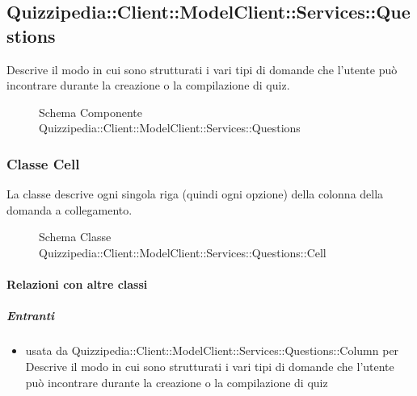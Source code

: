 \subsection{Quizzipedia::Client::ModelClient::Services::Questions}
Descrive il modo in cui sono strutturati i vari tipi di domande che l'utente può incontrare durante la creazione o la compilazione di quiz.
\begin{figure}[H]
\centering
\noindent{}
\caption[Schema Componente Quizzipedia::Client::ModelClient::Services::Questions]{Schema Componente Quizzipedia::Client::ModelClient::Services::Questions}
\end{figure}
\subsubsection{Classe Cell}
La classe descrive ogni singola riga (quindi ogni opzione) della colonna della domanda a collegamento.
\begin{figure}[H]
\centering
\noindent{}
\caption[Schema Classe Cell]{Schema Classe Quizzipedia::Client::ModelClient::Services::Questions::Cell}
\end{figure}
\paragraph{Relazioni con altre classi}
\subparagraph{Entranti}
\begin{itemize}
\item usata da Quizzipedia::Client::ModelClient::Services::Questions::Column per Descrive il modo in cui sono strutturati i vari tipi di domande che l'utente può incontrare durante la creazione o la compilazione di quiz
\end{itemize}
